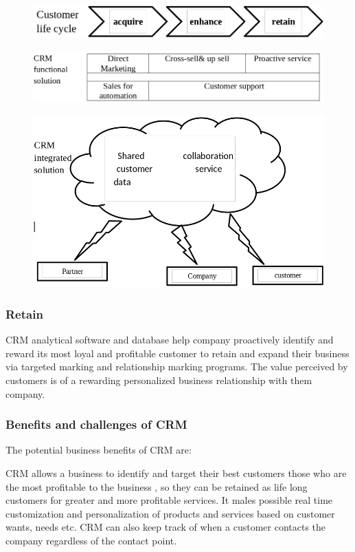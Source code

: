 \documentclass[twocolumn, 12pt, a4paper]{article}
\begin{document}
\begin{figure}[ht]
  \includegraphics[width=\columnwidth]{cuslc}
\end{figure}

\begin{figure}[ht]
  \includegraphics[width=\columnwidth]{crmfuncsol}
\end{figure}

\begin{figure}[ht]
  \includegraphics[width=\columnwidth]{crmintsol}
\end{figure}

\subsubsection{Retain}
CRM analytical software and database help company proactively identify and reward its most loyal and profitable customer to retain and expand their business via targeted marking and relationship marking programs. The value perceived by customers is of a rewarding personalized business relationship with them company.

\subsubsection{Benefits and challenges of CRM}
The potential business benefits of CRM are:

CRM allows a business to identify and target their best customers those who are the most profitable to the business , so they can be retained as life long customers for greater and more profitable services. It males possible real time customization and personalization of products and services  based on customer wants, needs etc. CRM can also keep track of when a customer contacts the company regardless of the contact point.
\end{document}
